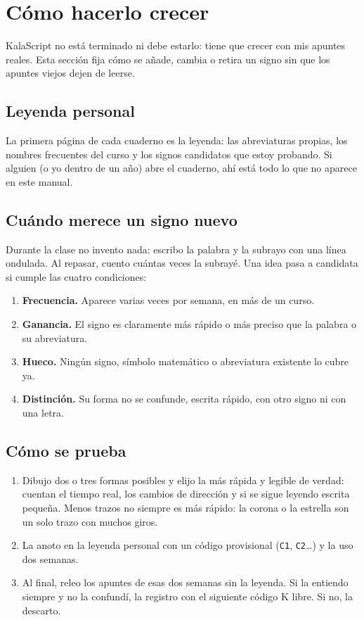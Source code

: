 \section{Cómo hacerlo crecer}\label{sec:crecer}

KalaScript no está terminado ni debe estarlo: tiene que crecer con mis apuntes
reales. Esta sección fija cómo se añade, cambia o retira un signo sin que los
apuntes viejos dejen de leerse.

\subsection{Leyenda personal}\label{sec:leyenda}
La primera página de cada cuaderno es la leyenda: las abreviaturas propias, los
nombres frecuentes del curso y los signos candidatos que estoy probando. Si
alguien (o yo dentro de un año) abre el cuaderno, ahí está todo lo que no
aparece en este manual.

\subsection{Cuándo merece un signo nuevo}
Durante la clase no invento nada: escribo la palabra y la subrayo con una línea
ondulada. Al repasar, cuento cuántas veces la subrayé. Una idea pasa a
candidata si cumple las cuatro condiciones:
\begin{enumerate}
\item \textbf{Frecuencia.} Aparece varias veces por semana, en más de un curso.
\item \textbf{Ganancia.} El signo es claramente más rápido o más preciso que
 la palabra o su abreviatura.
\item \textbf{Hueco.} Ningún signo, símbolo matemático o abreviatura existente
 lo cubre ya.
\item \textbf{Distinción.} Su forma no se confunde, escrita rápido, con otro signo
 ni con una letra.
\end{enumerate}

\subsection{Cómo se prueba}
\begin{enumerate}
\item Dibujo dos o tres formas posibles y elijo la más rápida y legible de verdad:
 cuentan el tiempo real, los cambios de dirección y si se sigue leyendo escrita
 pequeña. Menos trazos no siempre es más rápido: la corona o la estrella son un
 solo trazo con muchos giros.
\item La anoto en la leyenda personal con un código provisional (\texttt{C1},
 \texttt{C2}\ldots) y la uso dos semanas.
\item Al final, releo los apuntes de esas dos semanas sin la leyenda. Si la
 entiendo siempre y no la confundí, la registro con el siguiente código K libre.
 Si no, la descarto.
\end{enumerate}

